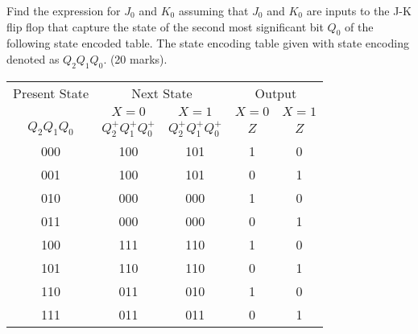 \begin{prob}
  Find the expression for $J_0$ and $K_0$ assuming that $J_0$ and $K_0$ are inputs to the J-K flip flop that capture the state of the second most significant bit $Q_0$ of the following state encoded table. The state encoding table given with state encoding denoted as $Q_2 Q_1 Q_0$. (20 marks).
\\
\begin{tabular}{ccccc}
  \toprule
  Present State & \multicolumn{2}{c}{Next State} & \multicolumn{2}{c}{Output}\\
                & $X=0$ & $X=1$ & $X=0$ & $X=1$ \\
  $Q_2 Q_1 Q_0$ & $Q_2^+ Q_1^+ Q_0^+$ & $Q_2^+ Q_1^+ Q_0^+$ & $Z$ & $Z$ \\
  \midrule
  000 & 100 & 101 & 1 & 0 \\
  001 & 100 & 101 & 0 & 1 \\
  010 & 000 & 000 & 1 & 0 \\
  011 & 000 & 000 & 0 & 1 \\
  100 & 111 & 110 & 1 & 0 \\
  101 & 110 & 110 & 0 & 1 \\
  110 & 011 & 010 & 1 & 0 \\
  111 & 011 & 011 & 0 & 1 \\
  \bottomrule
\end{tabular}
\end{prob}
